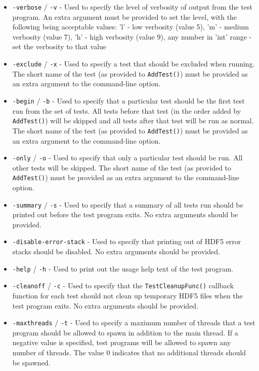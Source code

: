 \documentclass[../HDF5_RFC.tex]{subfiles}
\begin{document}
\begin{itemize}

    \item \texttt{-verbose} / \texttt{-v} - Used to specify the level of verbosity of output from the
          test program. An extra argument must be provided to set the level, with the following being
          acceptable values: 'l' - low verbosity (value 5), 'm' - medium verbosity (value 7),
          'h' - high verbosity (value 9), any number in 'int' range - set the verbosity to that value
    \item \texttt{-exclude} / \texttt{-x} - Used to specify a test that should be excluded when running.
          The short name of the test (as provided to \texttt{AddTest()}) must be provided as an extra
          argument to the command-line option.
    \item \texttt{-begin} / \texttt{-b} - Used to specify that a particular test should be the first
          test run from the set of tests. All tests before that test (in the order added by
          \texttt{AddTest()}) will be skipped and all tests after that test will be run as normal.
          The short name of the test (as provided to \texttt{AddTest()}) must be provided as an extra
          argument to the command-line option.
    \item \texttt{-only} / \texttt{-o} - Used to specify that only a particular test should be run.
          All other tests will be skipped. The short name of the test (as provided to \texttt{AddTest()})
          must be provided as an extra argument to the command-line option.
    \item \texttt{-summary} / \texttt{-s} - Used to specify that a summary of all tests run should be
          printed out before the test program exits. No extra arguments should be provided.
    \item \texttt{-disable-error-stack} - Used to specify that printing out of HDF5 error stacks should
          be disabled. No extra arguments should be provided.
    \item \texttt{-help} / \texttt{-h} - Used to print out the usage help text of the test program.
    \item \texttt{-cleanoff} / \texttt{-c} - Used to specify that the \texttt{TestCleanupFunc()} callback
          function for each test should not clean up temporary HDF5 files when the test program exits.
          No extra arguments should be provided.
    \item \texttt{-maxthreads} / \texttt{-t} - Used to specify a maximum number of threads that a test
          program should be allowed to spawn in addition to the main thread. If a negative value is
          specified, test programs will be allowed to spawn any number of threads. The value 0 indicates
          that no additional threads should be spawned.

\end{itemize}
\end{document}
